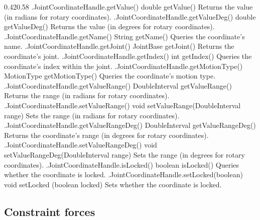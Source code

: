 %
\begin{methodtable}{0.42}{0.58}
\midline
%
\methodentry
{\mech.JointCoordinateHandle.getValue()}%
{double getValue()}%
{Returns the value (in radians for rotary coordinates).}%
%
\methodentry
{\mech.JointCoordinateHandle.getValueDeg()}%
{double getValueDeg()}%
{Returns the value (in degrees for rotary coordinates).}%
%
\methodentry
{\mech.JointCoordinateHandle.getName()}%
{String getName()}%
{Queries the coordinate's name.}%
%
\methodentry
{\mech.JointCoordinateHandle.getJoint()}%
{JointBase getJoint()}%
{Returns the coordinate's joint.}%
%
\methodentry
{\mech.JointCoordinateHandle.getIndex()}%
{int getIndex()}%
{Queries the coordinate's index within the joint.}%
%
\methodentry
{\mech.JointCoordinateHandle.getMotionType()}%
{MotionType getMotionType()}%
{Queries the coordinate's motion type.}%
%
\methodspace{0.5em}%
\methodentry
{\mech.JointCoordinateHandle.getValueRange()}%
{DoubleInterval getValueRange()}%
{Returns the range (in radians for rotary coordinates).}%
%
\methodentry
{\mech.JointCoordinateHandle.setValueRange()}%
{void setValueRange(DoubleInterval range)}%
{Sets the range (in radians for rotary coordinates).}%
%
\methodentry
{\mech.JointCoordinateHandle.getValueRangeDeg()}%
{DoubleInterval getValueRangeDeg()}%
{Returns the coordinate's range (in degrees for rotary coordinates).}%
%
\methodentry
{\mech.JointCoordinateHandle.setValueRangeDeg()}%
{void setValueRangeDeg(DoubleInterval range)}%
{Sets the range (in degrees for rotary coordinates).}%
%
\methodspace{0.5em}%
%
\methodentry
{\mech.JointCoordinateHandle.isLocked()}%
{boolean isLocked()}%
{Queries whether the coordinate is locked.}%
%
\methodentry
{\mech.JointCoordinateHandle.setLocked(boolean)}%
{void setLocked (boolean locked)}%
{Sets whether the coordinate is locked.}%
%
\midline
\end{methodtable}
%

\subsection{Constraint forces}

